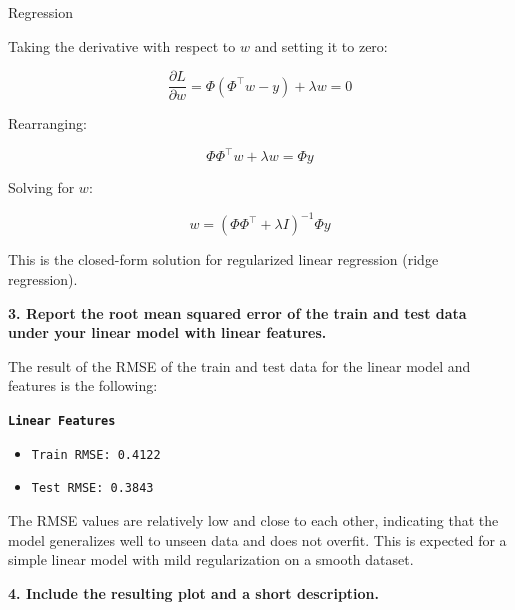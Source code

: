\documentclass[
	english,
        solution=true
	]{tudaexercise}
\begin{document}
\begin{task}[points=34]{Regression}
\begin{subtask}[points=8, title=Linear Features]
\begin{solution}
            Taking the derivative with respect to $w$ and setting it to zero:

            \[
            \frac{\partial L}{\partial w} = \Phi(\Phi^\top w - y) + \lambda w = 0
            \]

            Rearranging:

            \[
            \Phi \Phi^\top w + \lambda w = \Phi y
            \]

            Solving for $w$:

            \[
            w = (\Phi \Phi^\top + \lambda I)^{-1} \Phi y
            \]

            This is the closed-form solution for regularized linear regression (ridge regression).

            \vspace{2em}

            \textbf{3. Report the root mean squared error of the train and test data under your linear model with linear features.}

            The result of the RMSE of the train and test data for the linear model and features is the following:

            \vspace{1em}

            \textbf{\texttt{Linear Features}}
            \begin{itemize}
                \item \texttt{Train RMSE: 0.4122}
                \item \texttt{Test RMSE: 0.3843}
            \end{itemize}

            \vspace{1em}

            The RMSE values are relatively low and close to each other, indicating that the model generalizes well to unseen data and does not overfit.
            This is expected for a simple linear model with mild regularization on a smooth dataset.

            \vspace{2em}

            \textbf{4. Include the resulting plot and a short description.}


\end{solution}
\end{subtask}
\end{task}
\end{document}
